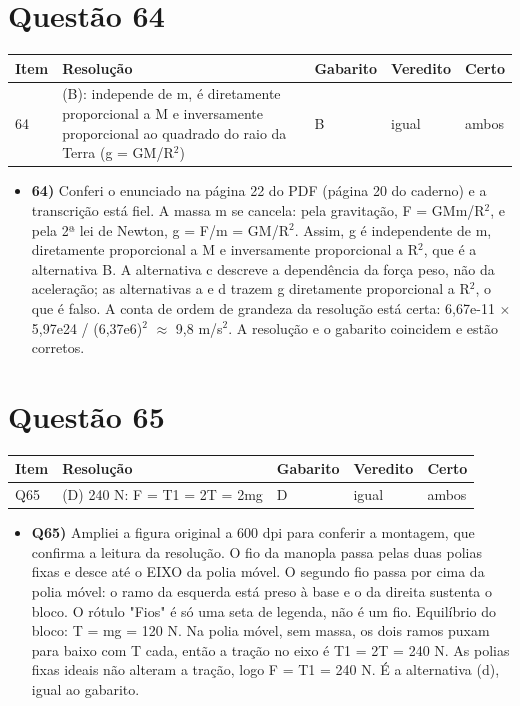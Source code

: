 \documentclass{article}%
\begin{document}
\section*{Questão 64}%
\begin{longtable}{@{}p{} p{} p{} p{} p{}@{}}\toprule Item & Resolução & Gabarito & Veredito & Certo \\ \midrule
64 & (B): independe de m, é diretamente proporcional a M e inversamente proporcional ao quadrado do raio da Terra (g = GM/R$^2$) & B & igual & ambos \\
\bottomrule\end{longtable}%
\begin{itemize}%
\item%
\textbf{64)} Conferi o enunciado na página 22 do PDF (página 20 do caderno) e a transcrição está fiel. A massa m se cancela: pela gravitação, F = GMm/R$^2$, e pela 2ª lei de Newton, g = F/m = GM/R$^2$. Assim, g é independente de m, diretamente proporcional a M e inversamente proporcional a R$^2$, que é a alternativa B. A alternativa c descreve a dependência da força peso, não da aceleração; as alternativas a e d trazem g diretamente proporcional a R$^2$, o que é falso. A conta de ordem de grandeza da resolução está certa: 6,67e{-}11 $\times$ 5,97e24 / (6,37e6)$^2$ $\approx$ 9,8 m/s$^2$. A resolução e o gabarito coincidem e estão corretos.%
\end{itemize}%
\section*{Questão 65}%
\begin{longtable}{@{}p{} p{} p{} p{} p{}@{}}\toprule Item & Resolução & Gabarito & Veredito & Certo \\ \midrule
Q65 & (D) 240 N: F = T1 = 2T = 2mg & D & igual & ambos \\
\bottomrule\end{longtable}%
\begin{itemize}%
\item%
\textbf{Q65)} Ampliei a figura original a 600 dpi para conferir a montagem, que confirma a leitura da resolução. O fio da manopla passa pelas duas polias fixas e desce até o EIXO da polia móvel. O segundo fio passa por cima da polia móvel: o ramo da esquerda está preso à base e o da direita sustenta o bloco. O rótulo "Fios" é só uma seta de legenda, não é um fio. Equilíbrio do bloco: T = mg = 120 N. Na polia móvel, sem massa, os dois ramos puxam para baixo com T cada, então a tração no eixo é T1 = 2T = 240 N. As polias fixas ideais não alteram a tração, logo F = T1 = 240 N. É a alternativa (d), igual ao gabarito.%
\end{itemize}%
\end{document}

